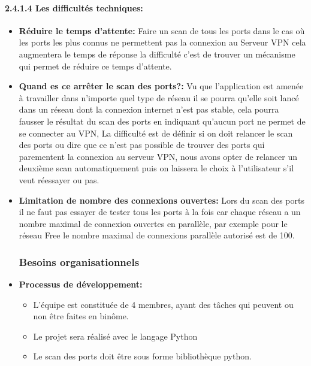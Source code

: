 \documentclass[12pt,a4paper]{article}
\begin{document}
\paragraph{2.4.1.4 Les difficultés techniques: }
\begin{itemize}
\item[] \textbf{Réduire le temps d’attente: }
Faire un scan de tous les ports dans le cas où  les ports les plus connus ne permettent pas la connexion au Serveur VPN cela augmentera le temps de réponse la difficulté c’est de trouver un mécanisme qui permet de réduire ce temps d’attente.\\
\item[] \textbf{Quand es ce arrêter le scan des ports?: }
Vu que l’application est amenée à travailler dans n’importe quel type de réseau il se pourra qu’elle soit lancé dans un réseau dont la connexion internet n’est pas stable, cela pourra fausser le résultat du scan des ports en indiquant qu’aucun port ne permet de se connecter au VPN, La difficulté est de définir si on doit relancer le scan des ports ou dire que ce n’est pas possible de trouver des ports qui parementent la connexion au serveur VPN, nous avons opter de relancer un deuxième scan automatiquement puis on laissera le choix à l’utilisateur s’il veut réessayer ou pas.
\end{itemize}
\begin{itemize}
\item[] \textbf{Limitation de nombre des connexions ouvertes: }
Lors du scan des ports il ne faut pas essayer de tester tous les ports à la fois car chaque réseau a un nombre maximal de connexion ouvertes en parallèle, par exemple pour le réseau Free le nombre maximal de connexions parallèle autorisé est de 100.\\

\subsubsection{Besoins organisationnels}

\item[] \textbf{Processus de développement: }\\
\begin{itemize}
\item L’équipe est constituée de 4 membres, ayant des tâches qui peuvent ou non être faites en binôme.\\
\item Le projet sera réalisé avec le langage Python\\
\item Le scan des ports doit être sous forme bibliothèque python.
\end{itemize}
\end{itemize}
\end{document}
